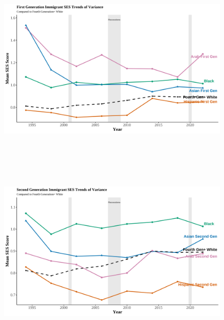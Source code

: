 \clearpage

\begin{center}
    \begin{figure}[H]
    \caption{}
    \includegraphics[width=\textwidth, height=9cm]{figure/08-var-SES-firstgens.png} 
    \label{fig:diag}
    \caption*{\footnotesize{}}
    \end{figure}
    \hfill%
\end{center}

\clearpage

\begin{center}
    \begin{figure}[H]
    \caption{}
    \includegraphics[width=\textwidth, height=9cm]{figure/09-var-SES-secondgens.png} 
    \label{fig:diag}
    \caption*{\footnotesize{}}
    \end{figure}
    \hfill%
\end{center}


